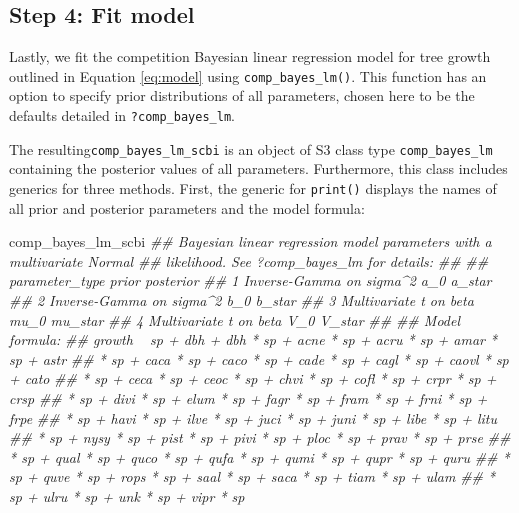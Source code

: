 \documentclass[12pt]{article}
\newenvironment{Shaded}{\begin{snugshade}}{\end{snugshade}}
\newcommand{\CommentTok}[1]{\textcolor[rgb]{0.56,0.35,0.01}{\textit{#1}}}
\newcommand{\DataTypeTok}[1]{\textcolor[rgb]{0.13,0.29,0.53}{#1}}
\newcommand{\KeywordTok}[1]{\textcolor[rgb]{0.13,0.29,0.53}{\textbf{#1}}}
\newcommand{\NormalTok}[1]{#1}
\newcommand{\OperatorTok}[1]{\textcolor[rgb]{0.81,0.36,0.00}{\textbf{#1}}}
\newcommand{\OtherTok}[1]{\textcolor[rgb]{0.56,0.35,0.01}{#1}}
\newcommand{\StringTok}[1]{\textcolor[rgb]{0.31,0.60,0.02}{#1}}
\begin{document}
\hypertarget{model-fit-predict}{%
\subsection{Step 4: Fit model}\label{model-fit-predict}}

Lastly, we fit the competition Bayesian linear regression model for tree
growth outlined in Equation \ref{eq:model} using
\texttt{comp\_bayes\_lm()}. This function has an option to specify prior
distributions of all parameters, chosen here to be the defaults detailed
in \texttt{?comp\_bayes\_lm}.

\begin{Shaded}
\end{Shaded}

The resulting\texttt{comp\_bayes\_lm\_scbi} is an object of S3 class
type \texttt{comp\_bayes\_lm} containing the posterior values of all
parameters. Furthermore, this class includes generics for three methods.
First, the generic for \texttt{print()} displays the names of all prior
and posterior parameters and the model formula:

\begin{Shaded}
\begin{Highlighting}[]
\NormalTok{comp_bayes_lm_scbi}
\CommentTok{## Bayesian linear regression model parameters with a multivariate Normal}
\CommentTok{## likelihood. See ?comp_bayes_lm for details:}
\CommentTok{## }
\CommentTok{##   parameter_type           prior posterior}
\CommentTok{## 1 Inverse-Gamma on sigma^2 a_0   a_star   }
\CommentTok{## 2 Inverse-Gamma on sigma^2 b_0   b_star   }
\CommentTok{## 3 Multivariate t on beta   mu_0  mu_star  }
\CommentTok{## 4 Multivariate t on beta   V_0   V_star   }
\CommentTok{## }
\CommentTok{## Model formula:}
\CommentTok{## growth ~ sp + dbh + dbh * sp + acne * sp + acru * sp + amar * sp + astr}
\CommentTok{## * sp + caca * sp + caco * sp + cade * sp + cagl * sp + caovl * sp + cato}
\CommentTok{## * sp + ceca * sp + ceoc * sp + chvi * sp + cofl * sp + crpr * sp + crsp}
\CommentTok{## * sp + divi * sp + elum * sp + fagr * sp + fram * sp + frni * sp + frpe}
\CommentTok{## * sp + havi * sp + ilve * sp + juci * sp + juni * sp + libe * sp + litu}
\CommentTok{## * sp + nysy * sp + pist * sp + pivi * sp + ploc * sp + prav * sp + prse}
\CommentTok{## * sp + qual * sp + quco * sp + qufa * sp + qumi * sp + qupr * sp + quru}
\CommentTok{## * sp + quve * sp + rops * sp + saal * sp + saca * sp + tiam * sp + ulam}
\CommentTok{## * sp + ulru * sp + unk * sp + vipr * sp}
\end{Highlighting}
\end{Shaded}
\end{document}
